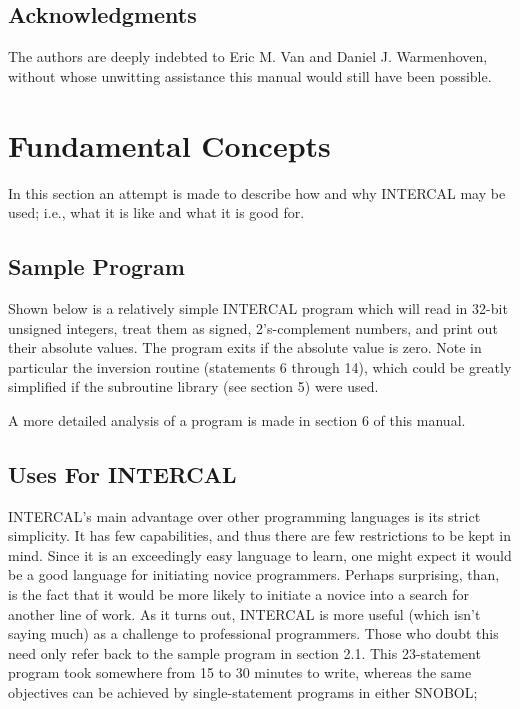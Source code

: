 \subsection{Acknowledgments}

The authors are deeply indebted to Eric M. Van and Daniel J. Warmenhoven,
without whose unwitting assistance this manual would still have been
possible.








\section{Fundamental Concepts}

In this section an attempt is made to describe how and why INTERCAL may be
used; i.e., what it is like and what it is good for.

\subsection{Sample Program}

Shown below is a relatively simple INTERCAL program which will read in
32-bit unsigned integers, treat them as signed, 2's-complement numbers, and
print out their absolute values.  The program exits if the absolute value
is zero.  Note in particular the inversion routine (statements 6 through
14), which could be greatly simplified if the subroutine library (see
section 5) were used.

A more detailed analysis of a program is made in section 6 of this manual.

\continuationchartrue %


\subsection{Uses For INTERCAL}

INTERCAL's main advantage over other programming languages is its strict
simplicity.  It has few capabilities, and thus there are few restrictions
to be kept in mind.  Since it is an exceedingly easy language to learn, one
might expect it would be a good language for initiating novice programmers.
Perhaps surprising, than, is the fact that it would be more likely to
initiate a novice into a search for another line of work.  As it turns out,
INTERCAL is more useful (which isn't saying much) as a challenge to
professional programmers.  Those who doubt this need only refer back to the
sample program in section 2.1.  This 23-statement program took somewhere
from 15 to 30 minutes to write, whereas the same objectives can be achieved
by single-statement programs in either SNOBOL;

